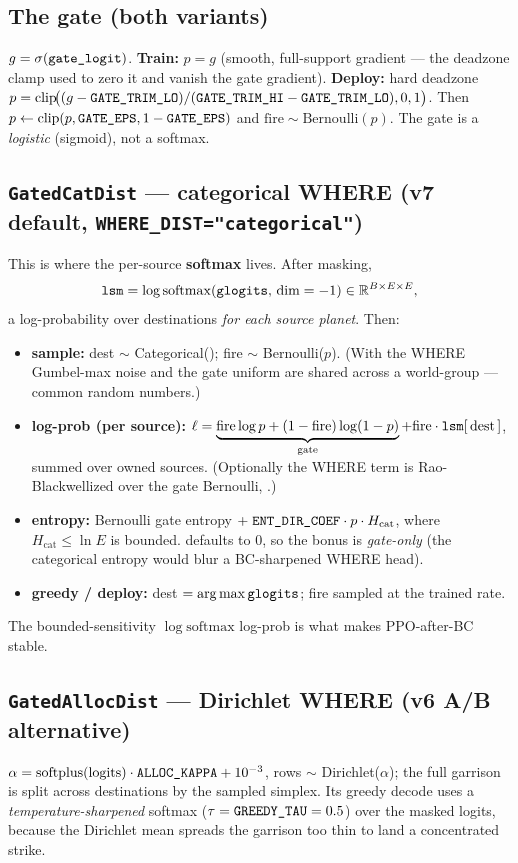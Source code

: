 \documentclass[11pt]{article}
\newcommand{\cd}[1]{\texttt{\detokenize{#1}}}
\newcommand{\R}{\mathbb{R}}
\begin{document}
\subsection{The gate (both variants)}
$g=\sigma(\cd{gate_logit})$. \textbf{Train:} $p=g$ (smooth, full-support gradient --- the deadzone
clamp used to zero it and vanish the gate gradient). \textbf{Deploy:} hard deadzone
$p=\mathrm{clip}\!\big((g-\cd{GATE_TRIM_LO})/(\cd{GATE_TRIM_HI}-\cd{GATE_TRIM_LO}),0,1\big)$. Then
$p\leftarrow\mathrm{clip}(p,\cd{GATE_EPS},1-\cd{GATE_EPS})$ and $\text{fire}\sim\text{Bernoulli}(p)$.
The gate is a \emph{logistic} (sigmoid), not a softmax.

\subsection{\texttt{GatedCatDist} --- categorical WHERE (v7 default, \texttt{WHERE\_DIST="categorical"})}
This is where the per-source \textbf{softmax} lives. After masking,
\[
  \cd{lsm}=\log\mathrm{softmax}(\cd{glogits},\,\text{dim}={-}1)\in\R^{B\times E\times E},
\]
a log-probability over destinations \emph{for each source planet}. Then:
\begin{itemize}
  \item \textbf{sample:} dest $\sim$ Categorical(\cd{lsm}); fire $\sim$ Bernoulli($p$). (With
        \cd{GRPO_CRN} the WHERE Gumbel-max noise and the gate uniform are shared across a world-group
        --- common random numbers.)
  \item \textbf{log-prob (per source):}
        $\ell = \underbrace{\text{fire}\log p+(1-\text{fire})\log(1-p)}_{\text{gate}}
        + \text{fire}\cdot \cd{lsm}[\,\text{dest}\,]$, summed over owned sources. (Optionally the
        WHERE term is Rao-Blackwellized over the gate Bernoulli, \cd{GRPO_RB_GATE}.)
  \item \textbf{entropy:} Bernoulli gate entropy $+\;\cd{ENT_DIR_COEF}\cdot p\cdot H_{\text{cat}}$,
        where $H_{\text{cat}}\le\ln E$ is bounded. \cd{ENT_DIR_COEF} defaults to 0, so the bonus is
        \emph{gate-only} (the categorical entropy would blur a BC-sharpened WHERE head).
  \item \textbf{greedy / deploy:} dest $=\arg\max\cd{glogits}$; fire sampled at the trained rate.
\end{itemize}
The bounded-sensitivity $\log\mathrm{softmax}$ log-prob is what makes PPO-after-BC stable.

\subsection{\texttt{GatedAllocDist} --- Dirichlet WHERE (v6 A/B alternative)}
$\alpha=\mathrm{softplus}(\text{logits})\cdot\cd{ALLOC_KAPPA}+10^{-3}$, rows $\sim$
Dirichlet($\alpha$); the full garrison is split across destinations by the sampled simplex. Its
greedy decode uses a \emph{temperature-sharpened} softmax ($\tau=\cd{GREEDY_TAU}=0.5$) over the masked
logits, because the Dirichlet mean spreads the garrison too thin to land a concentrated strike.
\end{document}
